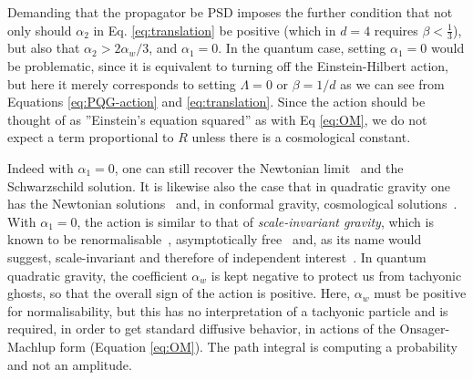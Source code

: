 \documentclass[aps,preprintnumbers,superscriptaddress,longbibliography]{revtex4-1}
\newcommand{\MS}[1]{{\color{blue}#1}}
\begin{document}
Demanding that the propagator be PSD imposes the further condition that not only should $\alpha_2$ in Eq. \eqref{eq:translation} be positive (which in $d=4$ requires $\beta<\frac{1}{3}$), but also that $\alpha_2> 2\alpha_w/3$, and $\alpha_1=0$.
In the quantum case, setting $\alpha_1=0$ would be problematic, since it is equivalent to turning off the Einstein-Hilbert action, but here it merely corresponds to setting $\Lambda=0$ or $\beta=1/d$ as we can see from Equations \eqref{eq:PQG-action} and \eqref{eq:translation}. Since the action should be thought of as ''Einstein's equation squared'' as with Eq \eqref{eq:OM}, we do not expect a term proportional to $R$ unless there is a cosmological constant. 

Indeed with $\alpha_1=0$, one can still recover the Newtonian limit~\cite{layton2023weak} and the Schwarzschild solution. It is likewise also the case that in quadratic gravity one has the Newtonian solutions~\cite{stelle1978classical,alvarez2016aspects} and, in conformal gravity, cosmological solutions~\cite{maldacena2011einstein}.
With $\alpha_1=0$, the action is similar to that of {\it scale-invariant gravity}, which is known to be renormalisable~\cite{salvio2014agravity}, asymptotically free~\cite{julve1978quantum,fradkin1982renormalizable} and, as its name would suggest, scale-invariant and therefore of independent interest~\cite{boulware1983zero,david1984calculability}.
In quantum quadratic gravity, the coefficient $\alpha_w$ is kept negative to protect us from tachyonic ghosts, so that the overall sign of the action is positive.  Here, $\alpha_w$  must be positive for normalisability, but this has no interpretation of a tachyonic particle and is required, in order to get standard diffusive behavior, in actions of the Onsager-Machlup form (Equation \eqref{eq:OM}). The path integral is computing a probability and not an amplitude.
\end{document}
